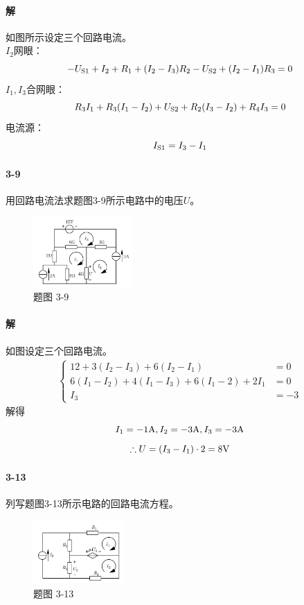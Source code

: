 \documentclass[hyperref, UTF8]{ctexart}
\newcommand{\volt}{{\rm V}}
\newcommand{\source}{{\rm S}}
\newcommand{\ampere}{{\rm A}}
\begin{document}
\paragraph{解}
如图所示设定三个回路电流。\\
$I_2$网眼：
$$-U_{\source 1}+I_2+R_1+(I_2-I_3)R_2-U_{\source 2}+(I_2-I_1)R_3=0$$
$I_1, I_3$合网眼：
$$R_3I_1+R_3(I_1-I_2)+U_{\source 2}+R_2(I_3-I_2)+R_4I_3=0$$
电流源：
$$I_{\source 1}=I_3-I_1$$

\paragraph{3-9}\label{3-9}
用回路电流法求题图3-9所示电路中的电压$U$。
\begin{figure}[!htb]
\centering
\includegraphics[width=0.337\textwidth]{p3-9.png}
\caption*{题图 3-9}
\end{figure}

\paragraph{解}如图设定三个回路电流。
\begin{gather*}
    \left\{ \begin{aligned}
    12+3(I_2-I_3)+6(I_2-I_1) &=0 \\
    6(I_1-I_2)+4(I_1-I_3)+6(I_1-2)+2I_1 &= 0 \\
    I_3 &= -3
    \end{aligned} \right.
\end{gather*}
解得
$$I_1=-1\ampere, I_2=-3\ampere, I_3=-3\ampere$$ $$\therefore U=(I_3-I_1)\cdot 2=8\volt$$

\paragraph{3-13}\label{3-13}
列写题图3-13所示电路的回路电流方程。
\begin{figure}[!htb]
\centering
\includegraphics[width=0.312\textwidth]{p3-13.png}
\caption*{题图 3-13}
\end{figure}
\end{document}
